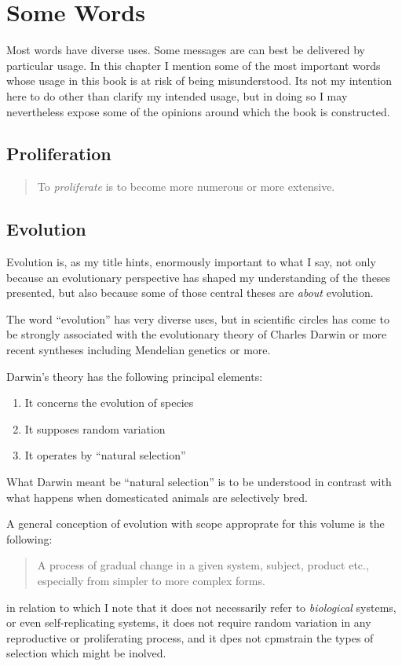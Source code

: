 \chapter{Some Words}\label{SomeWOrds}

Most words have diverse uses.
Some messages are can best be delivered by particular usage.
In this chapter I mention some of the most important words whose usage in this book is at risk of being misunderstood.
Its not my intention here to do other than clarify my intended usage, but in doing so I may nevertheless expose some of the opinions around which the book is constructed.

\section{Proliferation}

\begin{quote}
To \emph{proliferate} is to become more numerous or more extensive.
\end{quote}

\section{Evolution}

Evolution is, as my title hints, enormously important to what I say, not only because an evolutionary perspective has shaped my understanding of the theses presented, but also because some of those central theses are \emph{about} evolution.

The word ``evolution'' has very diverse uses, but in scientific circles has come to be strongly associated with the evolutionary theory of Charles Darwin or more recent syntheses including Mendelian genetics or more.

Darwin's theory has the following principal elements:
\begin{enumerate}
\item It concerns the evolution of species
\item It supposes random variation
\item It operates by ``natural selection''
\end{enumerate}

What Darwin meant be ``natural selection'' is to be understood in contrast with what happens when domesticated animals are selectively bred.



A general conception of evolution with scope approprate for this volume is the following:

\begin{quote}
  A process of gradual change in a given system, subject, product etc., especially from simpler to more complex forms. 
\end{quote}

in relation to which I note that it does not necessarily refer to \emph{biological} systems, or even self-replicating systems, it does not require random variation in any reproductive or proliferating process, and it dpes not cpmstrain the types of selection which might be inolved.

